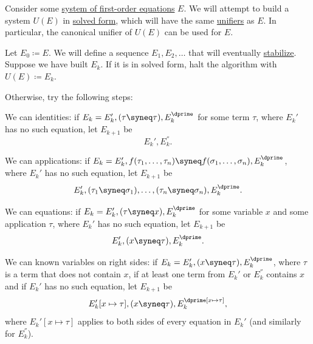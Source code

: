 \begin{algorithm}\label{alg:first_order_unification}
  Consider some \hyperref[def:fol_equation/system]{system of first-order equations} \( E \). We will attempt to build a system \( U(E) \) in \hyperref[def:fol_equation_system_solved_form]{solved form}, which will have the same \hyperref[def:fol_equation/syntactic_solution]{unifiers} as \( E \). In particular, the canonical unifier of \( U(E) \) can be used for \( E \).

  Let \( E_0 \coloneqq E \). We will define a sequence \( E_1, E_2, \ldots \) that will eventually \hyperref[def:chain_condition/stabilization]{stabilize}. Suppose we have built \( E_k \). If it is in solved form, halt the algorithm with \( U(E) \coloneqq E_k \).

  Otherwise, try the following steps:
  \begin{thmenum}
     We can  identities: if \( E_k = E_k', (\tau \syneq \tau), E_k^\dprime \) for some term \( \tau \), where \( E_k' \) has no such equation, let \( E_{k+1} \) be
    \begin{equation*}
      E_k', E_k^\dprime.
    \end{equation*}

     We can  applications: if \( E_k = E_k', f(\tau_1, \ldots, \tau_n) \syneq f(\sigma_1, \ldots, \sigma_n), E_k^\dprime \), where \( E_k' \) has no such equation, let \( E_{k+1} \) be
    \begin{equation*}
      E_k', (\tau_1 \syneq \sigma_1), \ldots, (\tau_n \syneq \sigma_n), E_k^\dprime.
    \end{equation*}

     We can  equations: if \( E_k = E_k', (\tau \syneq x), E_k^\dprime \) for some variable \( x \) and some application \( \tau \), where \( E_k' \) has no such equation, let \( E_{k+1} \) be
    \begin{equation*}
      E_k', (x \syneq \tau), E_k^\dprime.
    \end{equation*}

     We can  known variables on right sides: if \( E_k = E_k', (x \syneq \tau), E_k^\dprime \), where \( \tau \) is a term that does not contain \( x \), if at least one term from \( E_k' \) or \( E_k^\dprime \) contains \( x \) and if \( E_k' \) has no such equation, let \( E_{k+1} \) be
    \begin{equation*}
      E_k'[x \mapsto \tau], (x \syneq \tau), E_k^\dprime[x \mapsto \tau],
    \end{equation*}
    where \( E_k'[x \mapsto \tau] \) applies  to both sides of every equation in \( E_k' \) (and similarly for \( E_k^\dprime \)).


\end{thmenum}
\end{algorithm}
